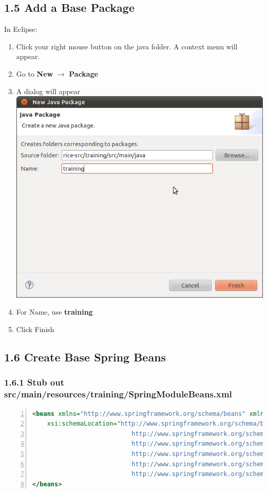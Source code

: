 \subsection*{1.5 Add a Base Package}
In Eclipse:
\begin{enumerate}
  \item Click your right mouse button on the java folder. A context menu will appear.
  \item Go to \textbf{New} $\rightarrow$ \textbf{Package}
  \item A dialog will appear\\
    \includegraphics[width=\textwidth]{images/Screenshot9.png}
  \item For Name, use \textbf{training}
  \item Click Finish
  \end{enumerate}

\subsection*{1.6 Create Base Spring Beans}
\subsubsection*{1.6.1 Stub out
  src/main/resources/training/SpringModuleBeans.xml}
\begin{lstlisting}[numbers=left,language=xml,basicstyle=\scriptsize,backgroundcolor=\color{ubergray},caption={Base
  SpringModuleBeans.xml},frame=single,breaklines=true]
<beans xmlns="http://www.springframework.org/schema/beans" xmlns:xsi="http://www.w3.org/2001/XMLSchema-instance" xmlns:aop="http://www.springframework.org/schema/aop" xmlns:tx="http://www.springframework.org/schema/tx"
	xsi:schemaLocation="http://www.springframework.org/schema/beans
                           http://www.springframework.org/schema/beans/spring-beans-2.0.xsd
                           http://www.springframework.org/schema/tx
                           http://www.springframework.org/schema/tx/spring-tx-2.0.xsd
                           http://www.springframework.org/schema/aop
                           http://www.springframework.org/schema/aop/spring-aop-2.0.xsd">
</beans>
\end{lstlisting}

